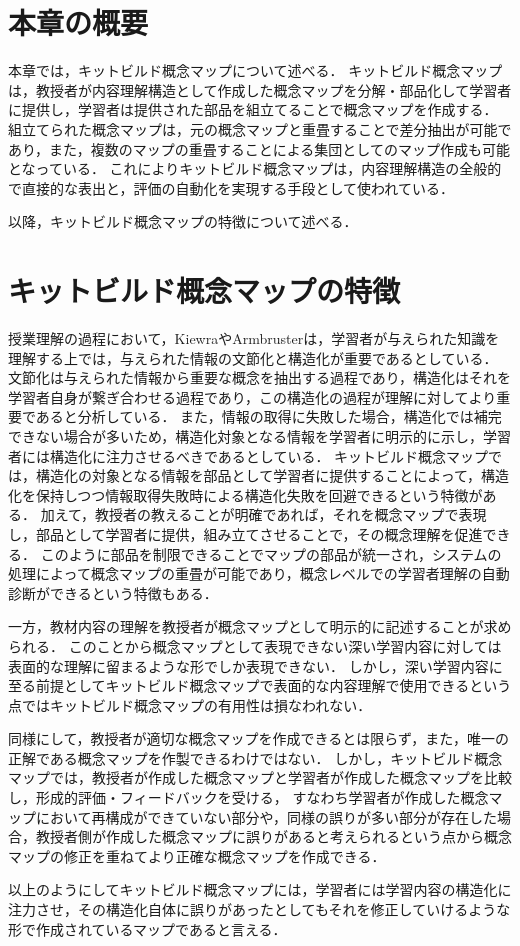 \section{本章の概要}
本章では，キットビルド概念マップについて述べる．
キットビルド概念マップ\cite{kit}\cite{kit2}は，教授者が内容理解構造として作成した概念マップを分解・部品化して学習者に提供し，学習者は提供された部品を組立てることで概念マップを作成する．
組立てられた概念マップは，元の概念マップと重畳することで差分抽出が可能であり，また，複数のマップの重畳することによる集団としてのマップ作成も可能となっている．
これによりキットビルド概念マップは，内容理解構造の全般的で直接的な表出と，評価の自動化を実現する手段として使われている．

以降，キットビルド概念マップの特徴について述べる．

\section{キットビルド概念マップの特徴}
授業理解の過程において，Kiewra\cite{kiewra}やArmbruster\cite{armbruster}は，学習者が与えられた知識を理解する上では，与えられた情報の文節化と構造化が重要であるとしている．
文節化は与えられた情報から重要な概念を抽出する過程であり，構造化はそれを学習者自身が繋ぎ合わせる過程であり，この構造化の過程が理解に対してより重要であると分析している．
また，情報の取得に失敗した場合，構造化では補完できない場合が多いため，構造化対象となる情報を学習者に明示的に示し，学習者には構造化に注力させるべきであるとしている．
キットビルド概念マップでは，構造化の対象となる情報を部品として学習者に提供することによって，構造化を保持しつつ情報取得失敗時による構造化失敗を回避できるという特徴がある．
加えて，教授者の教えることが明確であれば，それを概念マップで表現し，部品として学習者に提供，組み立てさせることで，その概念理解を促進できる．
このように部品を制限できることでマップの部品が統一され，システムの処理によって概念マップの重畳が可能であり，概念レベルでの学習者理解の自動診断ができるという特徴もある．

一方，教材内容の理解を教授者が概念マップとして明示的に記述することが求められる．
このことから概念マップとして表現できない深い学習内容に対しては表面的な理解に留まるような形でしか表現できない．
しかし，深い学習内容に至る前提としてキットビルド概念マップで表面的な内容理解で使用できるという点ではキットビルド概念マップの有用性は損なわれない．

同様にして，教授者が適切な概念マップを作成できるとは限らず，また，唯一の正解である概念マップを作製できるわけではない．
しかし，キットビルド概念マップでは，教授者が作成した概念マップと学習者が作成した概念マップを比較し，形成的評価・フィードバックを受ける，
すなわち学習者が作成した概念マップにおいて再構成ができていない部分や，同様の誤りが多い部分が存在した場合，教授者側が作成した概念マップに誤りがあると考えられるという点から概念マップの修正を重ねてより正確な概念マップを作成できる．

以上のようにしてキットビルド概念マップには，学習者には学習内容の構造化に注力させ，その構造化自体に誤りがあったとしてもそれを修正していけるような形で作成されているマップであると言える．